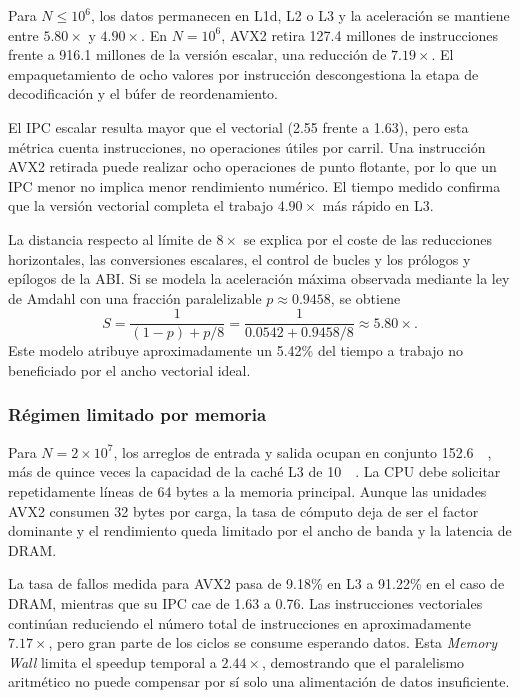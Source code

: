 \documentclass[journal]{IEEEtran}
\begin{document}
Para $N\leq10^6$, los datos permanecen en L1d, L2 o L3 y la aceleración se
mantiene entre $5.80\times$ y $4.90\times$. En $N=10^6$, AVX2 retira
127.4 millones de instrucciones frente a 916.1 millones de la versión escalar,
una reducción de $7.19\times$. El empaquetamiento de ocho valores por
instrucción descongestiona la etapa de decodificación y el búfer de reordenamiento.

El IPC escalar resulta mayor que el vectorial (2.55 frente a 1.63), pero esta
métrica cuenta instrucciones, no operaciones útiles por carril. Una instrucción
AVX2 retirada puede realizar ocho operaciones de punto flotante, por lo que un
IPC menor no implica menor rendimiento numérico. El tiempo medido confirma que
la versión vectorial completa el trabajo $4.90\times$ más rápido en L3.

La distancia respecto al límite de $8\times$ se explica por el coste de las
reducciones horizontales, las conversiones escalares, el control de bucles y
los prólogos y epílogos de la ABI. Si se modela la aceleración máxima observada
mediante la ley de Amdahl con una fracción paralelizable $p\approx0.9458$, se
obtiene
\begin{equation}
  S=\frac{1}{(1-p)+p/8}
   =\frac{1}{0.0542+0.9458/8}
   \approx5.80\times.
  \label{eq:amdahl-performance}
\end{equation}
Este modelo atribuye aproximadamente un 5.42\% del tiempo a trabajo no
beneficiado por el ancho vectorial ideal.

\subsubsection{Régimen limitado por memoria}

Para $N=2\times10^7$, los arreglos de entrada y salida ocupan en conjunto
\SI{152.6}{\mebi\byte}, más de quince veces la capacidad de la caché L3 de
\SI{10}{\mebi\byte}. La CPU debe solicitar repetidamente líneas de 64 bytes a
la memoria principal. Aunque las unidades AVX2 consumen 32 bytes por carga, la
tasa de cómputo deja de ser el factor dominante y el rendimiento queda limitado
por el ancho de banda y la latencia de DRAM.

La tasa de fallos medida para AVX2 pasa de 9.18\% en L3 a 91.22\% en el caso de
DRAM, mientras que su IPC cae de 1.63 a 0.76. Las instrucciones vectoriales
continúan reduciendo el número total de instrucciones en aproximadamente
$7.17\times$, pero gran parte de los ciclos se consume esperando datos. Esta
\textit{Memory Wall} limita el speedup temporal a $2.44\times$, demostrando que
el paralelismo aritmético no puede compensar por sí solo una alimentación de
datos insuficiente.
\end{document}
